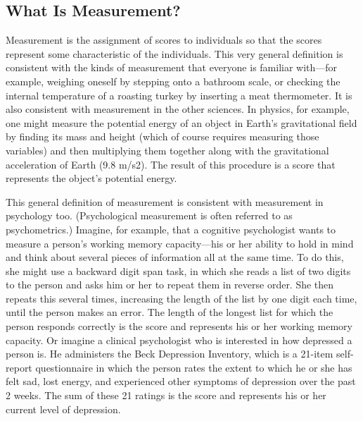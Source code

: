 

\subsection{What Is Measurement?}


Measurement is the assignment of scores to individuals so that the scores represent some characteristic of the individuals. This very general definition is consistent with the kinds of measurement that everyone is familiar with—for example, weighing oneself by stepping onto a bathroom scale, or checking the internal temperature of a roasting turkey by inserting a meat thermometer. It is also consistent with measurement in the other sciences. In physics, for example, one might measure the potential energy of an object in Earth's gravitational field by finding its mass and height (which of course requires measuring those variables) and then multiplying them together along with the gravitational acceleration of Earth (9.8 m/s2). The result of this procedure is a score that represents the object's potential energy.


This general definition of measurement is consistent with measurement in psychology too. (Psychological measurement is often referred to as psychometrics.) Imagine, for example, that a cognitive psychologist wants to measure a person's working memory capacity—his or her ability to hold in mind and think about several pieces of information all at the same time. To do this, she might use a backward digit span task, in which she reads a list of two digits to the person and asks him or her to repeat them in reverse order. She then repeats this several times, increasing the length of the list by one digit each time, until the person makes an error. The length of the longest list for which the person responds correctly is the score and represents his or her working memory capacity. Or imagine a clinical psychologist who is interested in how depressed a person is. He administers the Beck Depression Inventory, which is a 21-item self-report questionnaire in which the person rates the extent to which he or she has felt sad, lost energy, and experienced other symptoms of depression over the past 2 weeks. The sum of these 21 ratings is the score and represents his or her current level of depression.


